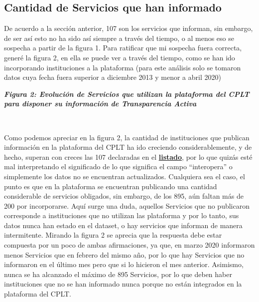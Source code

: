 \documentclass[11pt]{article}
\begin{document}
    
    \hypertarget{cantidad-de-servicios-que-han-informado}{%
\subsection{Cantidad de Servicios que han
informado}\label{cantidad-de-servicios-que-han-informado}}

    De acuerdo a la sección anterior, 107 son los servicios que informan,
sin embargo, de ser así esto no ha sido así siempre a través del tiempo,
o al menos eso se sospecha a partir de la figura 1. Para ratificar que
mi sospecha fuera correcta, generé la figura 2, en ella se puede ver a
través del tiempo, como se han ido incorporando instituciones a la
plataforma (para este análisis solo se tomaron datos cuya fecha fuera
superior a diciembre 2013 y menor a abril 2020)

\textbf{\emph{Figura 2: Evolución de Servicios que utilizan la
plataforma del CPLT para disponer su información de Transparencia
Activa}}

    \begin{center}
    \end{center}
    { \hspace*{\fill} \\}
    
    Como podemos apreciar en la figura 2, la cantidad de instituciones que
publican información en la plataforma del CPLT ha ido creciendo
considerablemente, y de hecho, superan con creces las 107 declaradas en
el
\textbf{\href{https://www.portaltransparencia.cl/PortalPdT/web/guest/opendata\#_48_INSTANCE_GI66ozEZ7DNy_=dataset\%2Forganismos\%2Fresource\%2F527e355d-f401-48c7-b984-2d2971db9713}{listado}},
por lo que quizás esté mal interpretando el significado de lo que
significa el campo ``interopera'' o simplemente los datos no se
encuentran actualizados. Cualquiera sea el caso, el punto es que en la
plataforma se encuentran publicando una cantidad considerable de
servicios obligados, sin embargo, de los 895, aún faltan más de 200 por
incorporarse. Aquí surge una duda, aquellos Servicios que no publicaron
corresponde a instituciones que no utilizan las plataforma y por lo
tanto, sus datos nunca han estado en el dataset, o hay servicios que
informan de manera intermitente. Mirando la figura 2 se aprecia que la
respuesta debe estar compuesta por un poco de ambas afirmaciones, ya
que, en marzo 2020 informaron menos Servicios que en febrero del mismo
año, por lo que hay Servicios que no informaron en el último mes pero
que si lo hicieron el mes anterior. Asimismo, nunca se ha alcanzado el
máximo de 895 Servicios, por lo que deben haber instituciones que no se
han informado nunca porque no están integrados en la plataforma del
CPLT.
\end{document}
